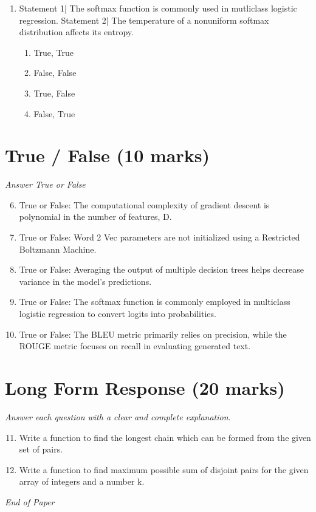 \documentclass[12pt]{article}
\begin{document}
\begin{enumerate}[label=\arabic*.]
\begin{enumerate}[label=(\alph*)]
    \item False, False
    \item True, False
    \item False, True
\end{enumerate}
\item Statement 1| The softmax function is commonly used in mutliclass logistic regression. Statement 2| The temperature of a nonuniform softmax distribution affects its entropy.
\begin{enumerate}[label=(\alph*)]
    \item True, True
    \item False, False
    \item True, False
    \item False, True
\end{enumerate}
\end{enumerate}

\section*{True / False (10 marks)}
\textit{Answer True or False}
\begin{enumerate}[label=\arabic*.]
\setcounter{enumi}{5}
\item True or False: The computational complexity of gradient descent is polynomial in the number of features, D.
\item True or False: Word 2 Vec parameters are not initialized using a Restricted Boltzmann Machine.
\item True or False: Averaging the output of multiple decision trees helps decrease variance in the model's predictions.
\item True or False: The softmax function is commonly employed in multiclass logistic regression to convert logits into probabilities.
\item True or False: The BLEU metric primarily relies on precision, while the ROUGE metric focuses on recall in evaluating generated text.
\end{enumerate}

\section*{Long Form Response (20 marks)}
\textit{Answer each question with a clear and complete explanation.}
\begin{enumerate}[label=\arabic*.]
\setcounter{enumi}{10}
\item Write a function to find the longest chain which can be formed from the given set of pairs.
\item Write a function to find maximum possible sum of disjoint pairs for the given array of integers and a number k.
\end{enumerate}

\vfill
\noindent\textit{End of Paper}
\end{document}
